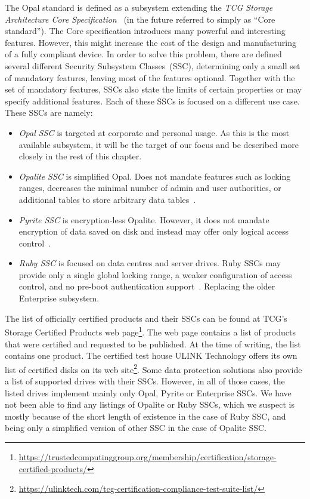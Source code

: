 The Opal standard is defined as a subsystem extending the \emph{TCG Storage Architecture Core Specification}~\cite{tcg-storage-core} (in the future referred to simply as ``Core standard''). 
The Core specification introduces many powerful and interesting features. However, this might increase the cost of the design and manufacturing of a fully compliant device. In order to solve this problem, there are defined several different Security Subsystem Classes~(SSC), determining only a small set of mandatory features, leaving most of the features optional. Together with the set of mandatory features, SSCs also state the limits of certain properties or may specify additional features.
Each of these SSCs is focused on a different use case. These SSCs are namely: \begin{itemize}
    \item \emph{Opal SSC} is targeted at corporate and personal usage. As this is the most available subsystem, it will be the target of our focus and be described more closely in the rest of this chapter.
    \item \emph{Opalite SSC} is simplified Opal. Does not mandate features such as locking ranges, decreases the minimal number of admin and user authorities, or additional tables to store arbitrary data tables~\cite{tcg-opalite}. %
    \item \emph{Pyrite SSC} is encryption-less Opalite. However, it does not mandate encryption of data saved on disk and instead may offer only logical access control~\cite{tcg-pyrite}.
    \item \emph{Ruby SSC} is focused on data centres and server drives. Ruby SSCs may provide only a single global locking range, a weaker configuration of access control, and no pre-boot authentication support~\cite{tcg-ruby}. Replacing the older Enterprise subsystem.
\end{itemize}
The list of officially certified products and their SSCs can be found at TCG's Storage Certified Products web page\footnote{\url{https://trustedcomputinggroup.org/membership/certification/storage-certified-products/}}. The web page contains a list of products that were certified and requested to be published. At the time of writing, the list contains one product. The certified test house ULINK Technology offers its own list of certified disks on its web site\footnote{\url{https://ulinktech.com/tcg-certification-compliance-test-suite-list/}}. Some data protection solutions also provide a list of supported drives with their SSCs. However, in all of those cases, the listed drives implement mainly only Opal, Pyrite or Enterprise SSCs. We have not been able to find any listings of Opalite or Ruby SSCs, which we suspect is mostly because of the short length of existence in the case of Ruby SSC, and being only a simplified version of other SSC in the case of Opalite SSC.


